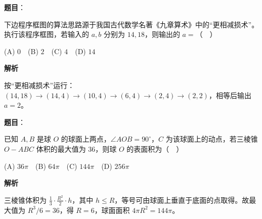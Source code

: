 \begin{answer}

\textbf{题目}：

下边程序框图的算法思路源于我国古代数学名著《九章算术》中的“更相减损术”。执行该程序框图，若输入的 $a,b$ 分别为 $14,18$，则输出的 $a=$（　）
\nopagebreak[4]
\begin{center}\end{center}
\nopagebreak[4]
(A) $0$　(B) $2$　(C) $4$　(D) $14$

\textbf{解析}

按“更相减损术”运行：$(14,18)\to(14,4)\to(10,4)\to(6,4)\to(2,4)\to(2,2)$，相等后输出 $a=2$。


\end{answer}
\begin{answer}

\textbf{题目}：

已知 $A,B$ 是球 $O$ 的球面上两点，$\angle AOB=90^\circ$，$C$ 为该球面上的动点，若三棱锥 $O-ABC$ 体积的最大值为 $36$，则球 $O$ 的表面积为（　）

(A) $36\pi$　(B) $64\pi$　(C) $144\pi$　(D) $256\pi$

\textbf{解析}

三棱锥体积为 $\frac13\cdot\frac{R^2}{2}\cdot h$，其中 $h\le R$，等号可由球面上垂直于底面的点取得。故最大值为 $R^3/6=36$，得 $R=6$，球面面积 $4\pi R^2=144\pi$。


\end{answer}
